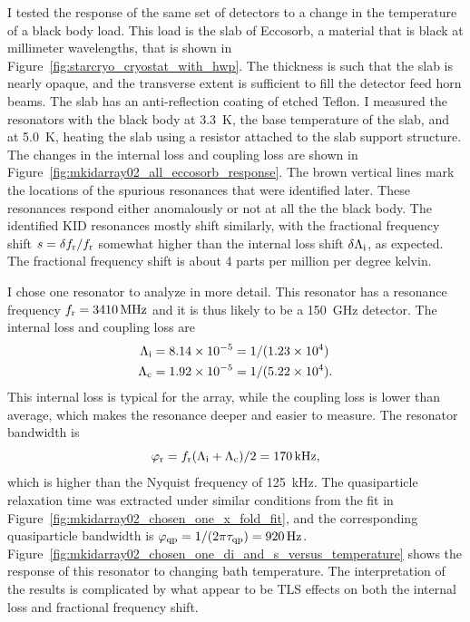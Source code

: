 I tested the response of the same set of detectors to a change in the temperature of a black body load.
This load is the slab of Eccosorb, a material that is black at millimeter wavelengths, that is shown in Figure~\ref{fig:starcryo_cryostat_with_hwp}.
The thickness is such that the slab is nearly opaque, and the transverse extent is sufficient to fill the detector feed horn beams.
The slab has an anti-reflection coating of etched Teflon.
I measured the resonators with the black body at \SI{3.3}{K}, the base temperature of the slab, and at \SI{5.0}{K}, heating the slab using a resistor attached to the slab support structure.
The changes in the internal loss and coupling loss are shown in Figure~\ref{fig:mkidarray02_all_eccosorb_response}.
The brown vertical lines mark the locations of the spurious resonances that were identified later.
These resonances respond either anomalously or not at all the the black body.
The identified KID resonances mostly shift similarly, with the fractional frequency shift $s = \delta f_{\mathrm{r}} / f_{\mathrm{r}}$ somewhat higher than the internal loss shift $\delta \Lambda_{\mathrm{i}}$, as expected.
The fractional frequency shift is about 4 parts per million per degree kelvin.

I chose one resonator to analyze in more detail.
This resonator has a resonance frequency 
$f_{\mathrm{r}} = \SI{3410}{MHz}$
and it is thus likely to be a \SI{150}{GHz} detector.
The internal loss and coupling loss are
\begin{align}
\Lambda_{\mathrm{i}} &= \num{8.14e-5} = 1 / (\num{1.23e4}) \\
\Lambda_{\mathrm{c}} &= \num{1.92e-5} = 1 / (\num{5.22e4}).
\end{align}
This internal loss is typical for the array, while the coupling loss is lower than average, which makes the resonance deeper and easier to measure.
The resonator bandwidth is
\begin{equation}
\varphi_{\mathrm{r}}
  =
  f_{\mathrm{r}} (\Lambda_{\mathrm{i}} + \Lambda_{\mathrm{c}}) / 2
  = 
  \SI{170}{kHz},
\end{equation}
which is higher than the Nyquist frequency of \SI{125}{kHz}.
The quasiparticle relaxation time was extracted under similar conditions from the fit in Figure~\ref{fig:mkidarray02_chosen_one_x_fold_fit}, and the  corresponding quasiparticle bandwidth is
$\varphi_{\mathrm{qp}}
  =
  1 / (2 \pi \tau_{\mathrm{qp}})
  =
  \SI{920}{Hz}$.
Figure~\ref{fig:mkidarray02_chosen_one_di_and_s_versus_temperature} shows the response of this resonator to changing bath temperature.
The interpretation of the results is complicated by what appear to be TLS effects on both the internal loss and fractional frequency shift.

